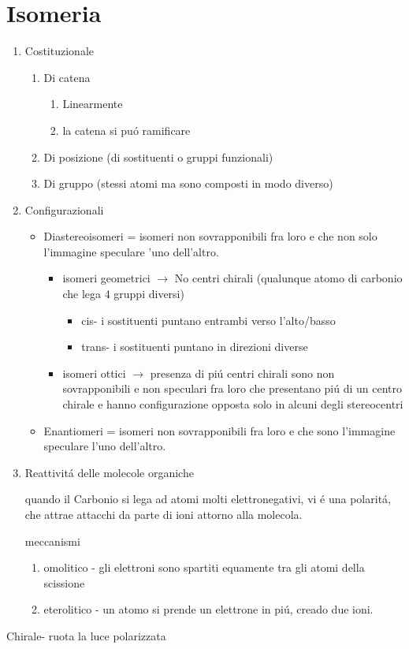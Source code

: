 \documentclass{article}
\begin{document}
\section{Isomeria}
\begin{enumerate}
    \item Costituzionale
    \begin{enumerate}
        \item Di catena
        \begin{enumerate}
            \item Linearmente
            \item la catena si puó ramificare
        \end{enumerate}
        \item Di posizione (di sostituenti o gruppi funzionali)
        \item Di gruppo (stessi atomi ma sono composti in modo diverso)
    \end{enumerate}
    \item Configurazionali
    \begin{itemize}
        \item Diastereoisomeri = isomeri non sovrapponibili fra loro e che non solo l'immagine speculare 'uno dell'altro.
        \begin{itemize}
            \item isomeri geometrici $\to$ No centri chirali (qualunque atomo di carbonio che lega 4 gruppi diversi)
            \begin{itemize}
                \item cis- i sostituenti puntano entrambi verso l'alto/basso
                \item trans- i sostituenti puntano in direzioni diverse
            \end{itemize}
            \item isomeri ottici $\to$ presenza di piú centri chirali
            sono non sovrapponibili e non speculari fra loro che presentano piú di un centro chirale e hanno configurazione opposta solo in alcuni degli stereocentri
        \end{itemize}
        \item Enantiomeri = isomeri non sovrapponibili fra loro e che sono l'immagine speculare l'uno dell'altro.
    \end{itemize}
    \item Reattivitá delle molecole organiche
    
    quando il Carbonio si lega ad atomi molti elettronegativi, vi é una polaritá, che attrae attacchi da parte di ioni attorno alla molecola.

    meccanismi
    \begin{enumerate}
        \item omolitico - gli elettroni sono spartiti equamente tra gli atomi della scissione
        \item eterolitico - un atomo si prende un elettrone in piú, creado due ioni.
    \end{enumerate}
\end{enumerate}
Chirale- ruota la luce polarizzata
\end{document}
